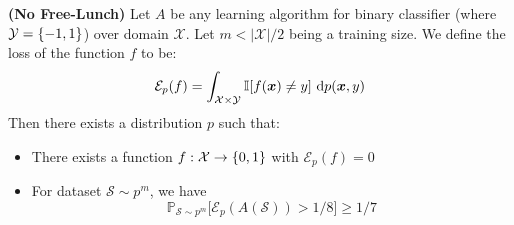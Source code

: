 \begin{theorem}{\textbf{(No Free-Lunch)}}
    Let $A$ be any learning algorithm for binary classifier (where $\mathcal{Y} = \left\{ -1, 1 \right\}$) over domain $\mathcal{X}$. Let $m < |\mathcal{X}|/2$ being a training size. We define the loss of the function $f$ to be:
    \begin{equation*}
        \mathcal{E}_{p}(f) = \int_{\mathcal{X}\times\mathcal{Y}} \mathbb{I}[f(\boldsymbol x) \ne y] \ \mathrm{d} p(\boldsymbol x, y)
    \end{equation*}
    Then there exists a distribution $p$ such that:
    \begin{itemize}
        \item There exists a function $f : \mathcal{X}\rightarrow\left\{ 0, 1 \right\}$ with $\mathcal{E}_p(f) = 0$
        \item For dataset $\mathcal{S} \sim p^m$, we have 
        \begin{equation*}
            \mathbb{P}_{\mathcal{S} \sim p^m}\Big[\mathcal{E}_p(A(\mathcal{S})) > 1/8\Big] \ge 1/7
        \end{equation*}
    \end{itemize}
\end{theorem}
